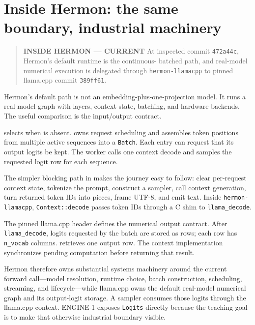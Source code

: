 \section{Inside Hermon: the same boundary, industrial
machinery}\label{inside-hermon-the-same-boundary-industrial-machinery}

\begin{quote}
\textbf{INSIDE HERMON --- CURRENT} At inspected commit \texttt{472a44c},
Hermon's default runtime is the continuous- batched path, and real-model
numerical execution is delegated through \texttt{hermon-llamacpp} to
pinned llama.cpp commit \texttt{389ff61}.
\end{quote}

Hermon's default path is not an embedding-plus-one-projection model. It
runs a real model graph with layers, context state, batching, and
hardware backends. The useful comparison is the input/output contract.

\texttt{} selects
\texttt{} when
\texttt{} is absent.
\texttt{} owns request
scheduling and assembles token positions from multiple active sequences
into a \texttt{Batch}. Each entry can request that its output logits be
kept. The worker calls one context decode and samples the requested
logit row for each sequence.

The simpler blocking path in
\texttt{} makes the journey
easy to follow: clear per-request context state, tokenize the prompt,
construct a sampler, call context generation, turn returned token IDs
into pieces, frame UTF-8, and emit text. Inside
\texttt{hermon-llamacpp}, \texttt{Context::decode} passes token IDs
through a C shim to \texttt{llama\_decode}.

The pinned llama.cpp header defines the numerical output contract. After
\texttt{llama\_decode}, logits requested by the batch are stored as
rows; each row has \texttt{n\_vocab} columns.
\texttt{} retrieves one output row.
The context implementation synchronizes pending computation before
returning that result.

Hermon therefore owns substantial systems machinery around the current
forward call---model resolution, runtime choice, batch construction,
scheduling, streaming, and lifecycle---while llama.cpp owns the default
real-model numerical graph and its output-logit storage. A sampler
consumes those logits through the llama.cpp context. ENGINE-1 exposes
\texttt{Logits} directly because the teaching goal is to make that
otherwise industrial boundary visible.

